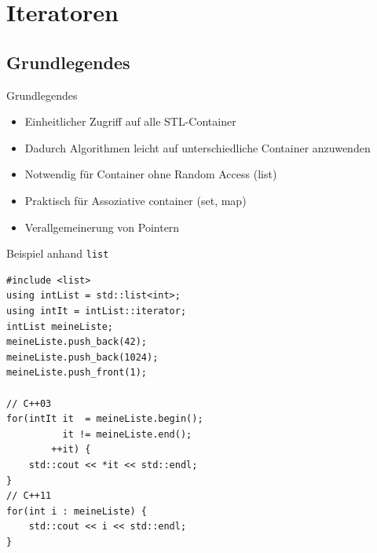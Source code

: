 \section{Iteratoren}


\subsection{Grundlegendes}

\begin{frame}[fragile]{Grundlegendes}
	\begin{itemize}
		\item Einheitlicher Zugriff auf alle STL-Container
		\item Dadurch Algorithmen leicht auf unterschiedliche Container anzuwenden
		\item Notwendig für Container ohne Random Access (list)
		\item Praktisch für Assoziative container (set, map)
		\item Verallgemeinerung von Pointern
	\end{itemize}
\end{frame}

\begin{frame}[fragile]{Beispiel anhand \texttt{list}}
	\begin{lstlisting}[]
#include <list>
using intList = std::list<int>;
using intIt = intList::iterator;
intList meineListe;
meineListe.push_back(42);
meineListe.push_back(1024);
meineListe.push_front(1);

// C++03
for(intIt it  = meineListe.begin();
          it != meineListe.end();
        ++it) {
    std::cout << *it << std::endl;
}
// C++11
for(int i : meineListe) {
    std::cout << i << std::endl;
}
	\end{lstlisting}
\end{frame}

